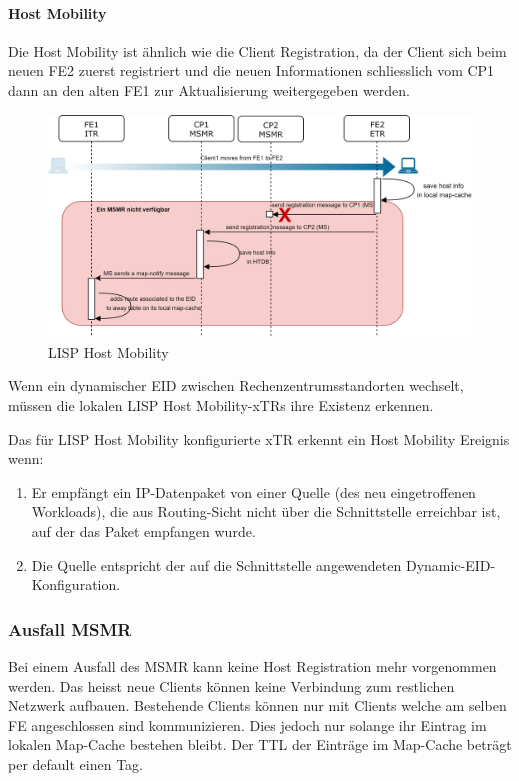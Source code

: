 \paragraph{Host Mobility}
Die Host Mobility ist ähnlich wie die Client Registration, da der Client sich beim neuen FE2 zuerst registriert und die neuen Informationen schliesslich vom CP1 dann an den alten FE1 zur Aktualisierung weitergegeben werden.

\begin{figure}[H]
	\centering
	\includegraphics[width=1\linewidth]{img/Absicherung/LISP-HostMobility-Fail}
	\caption{LISP Host Mobility}
	\label{fig:LISP Host Mobility}
\end{figure}

Wenn ein dynamischer EID zwischen Rechenzentrumsstandorten wechselt, müssen die lokalen LISP Host Mobility-xTRs ihre Existenz erkennen. 

Das für LISP Host Mobility konfigurierte xTR erkennt ein Host Mobility Ereignis wenn:
\begin{enumerate}
	\item Er empfängt ein IP-Datenpaket von einer Quelle (des neu eingetroffenen Workloads), die aus Routing-Sicht nicht über die Schnittstelle erreichbar ist, auf der das Paket empfangen wurde.
	\item Die Quelle entspricht der auf die Schnittstelle angewendeten Dynamic-EID-Konfiguration.
\end{enumerate}


\subsubsection{Ausfall MSMR}
Bei einem Ausfall des MSMR kann keine Host Registration mehr vorgenommen werden. Das heisst neue Clients können keine Verbindung zum restlichen Netzwerk aufbauen. Bestehende Clients können nur mit Clients welche am selben FE angeschlossen sind kommunizieren. Dies jedoch nur solange ihr Eintrag im lokalen Map-Cache bestehen bleibt. Der TTL der Einträge im Map-Cache beträgt per default einen Tag. 

